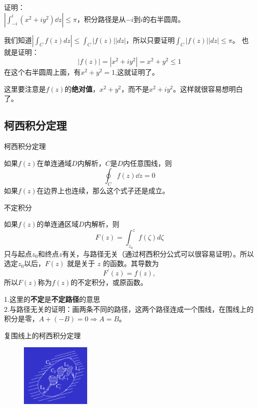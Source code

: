 \documentclass[cn,hazy,blue,14pt,normal]{elegantnote}
\numberwithin{equation}{section}
\begin{document}
\begin{example}
	证明：\\
	$\left | \int_{-i}^{i}  \left(x^2 + iy^2\right)\dd z \right | \leqslant \pi $，积分路径是从$-i$到$i$的右半圆周。
\end{example}	
我们知道$|\int_C f(z) dz | \leqslant \int_C |f(z)| |dz|$，所以只要证明$\int_C |f(z)| |dz| \leqslant \pi$。
也就是证明：$$|f(z)| = |x^2 + iy^2| = x^2 + y^2 \leqslant 1$$
在这个右半圆周上面，有$x^2 + y^2 = 1$,这就证明了。
\begin{note}
	这里要注意是$f(z)$的\textbf{绝对值}，$x^2 + y^2$，而不是$x^2 + iy^2$。这样就很容易想明白了。
\end{note}
\subsection{柯西积分定理}
\begin{definition}\label{柯西积分定理}
	柯西积分定理
\end{definition}
如果$f(z)$在单连通域$D$内解析，$C$是$D$内任意围线，则
$$ \oint_C f(z) \dd z = 0 $$
如果$f(z)$在边界上也连续，那么这个式子还是成立。

\begin{definition}
	不定积分
\end{definition}
如果$f(z)$的单连通区域$D$内解析，则
$$
F(z) = \int^z_{z_0} f(\zeta) d\zeta
$$
只与起点$z_0$和终点$z$有关，与路径无关（通过柯西积分公式可以很容易证明）。所以选定$z_0$以后，$F(z)$ 就是关于 $z$ 的函数。其导数为
$$
F^\prime(z) = f(z),
$$
所以$F(z)$称为$f(z)$的不定积分，或原函数。
\begin{note}
	1.这里的\textbf{不定}是\textbf{不定路径}的意思\\
	2.与路径无关的证明：画两条不同的路径，这两个路径连成一个围线，在围线上的积分是零，$A + (-B) = 0 \Rightarrow A = B$。
\end{note}

\begin{definition}
	复围线上的柯西积分定理
\end{definition}

\begin{figure}
	\includegraphics[width=0.3\textwidth]{./image/复围线柯西积分定理.png}
\end{figure}
\end{document}
